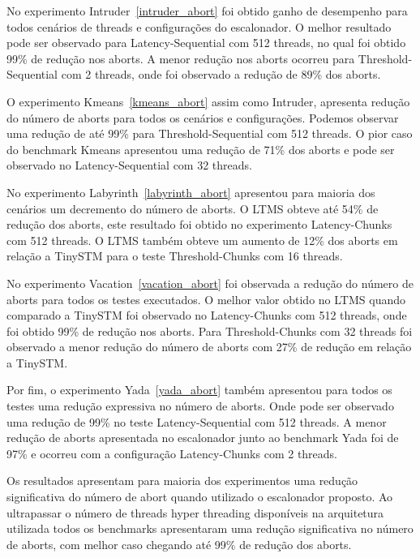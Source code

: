 \documentclass[diss,capa]{texufpel}
\begin{document}
No experimento Intruder~\ref{intruder_abort} foi obtido ganho de desempenho para todos cenários de threads e configurações do escalonador. O melhor resultado pode ser observado para Latency-Sequential com 512 threads, no qual foi obtido 99\% de redução nos aborts. A menor redução nos aborts ocorreu para Threshold-Sequential com 2 threads, onde foi observado a redução de 89\% dos aborts.



O experimento Kmeans~\ref{kmeans_abort} assim como Intruder, apresenta redução do número de aborts para todos os cenários e configurações. Podemos observar uma redução de até 99\% para Threshold-Sequential com 512 threads. O pior caso do benchmark Kmeans apresentou uma redução de 71\% dos aborts e pode ser observado no Latency-Sequential com 32 threads.



No experimento Labyrinth~\ref{labyrinth_abort} apresentou para maioria dos cenários um decremento do número de aborts. O LTMS obteve até 54\% de redução dos aborts, este resultado foi obtido no experimento Latency-Chunks com 512 threads. O LTMS também obteve um aumento de 12\% dos aborts em relação a TinySTM para o teste Threshold-Chunks com 16 threads.



No experimento Vacation~\ref{vacation_abort} foi observada a redução do número de aborts para todos os testes executados. O melhor valor obtido no LTMS quando comparado a TinySTM foi observado no Latency-Chunks com 512 threads, onde foi obtido 99\% de redução nos aborts. Para Threshold-Chunks com 32 threads foi observado a menor redução do número de aborts com 27\% de redução em relação a TinySTM.



Por fim, o experimento Yada~\ref{yada_abort} também apresentou para todos os testes uma redução expressiva no número de aborts. Onde pode ser observado uma redução de 99\% no teste Latency-Sequential com 512 threads. A menor redução de aborts apresentada no escalonador junto ao benchmark Yada foi de 97\% e ocorreu com a configuração Latency-Chunks com 2 threads.



Os resultados apresentam para maioria dos experimentos uma redução significativa do número de abort quando utilizado o escalonador proposto. Ao ultrapassar o número de threads hyper threading disponíveis na arquitetura utilizada todos os benchmarks apresentaram uma redução significativa no número de aborts, com melhor caso chegando até 99\% de redução dos aborts.
\end{document}
